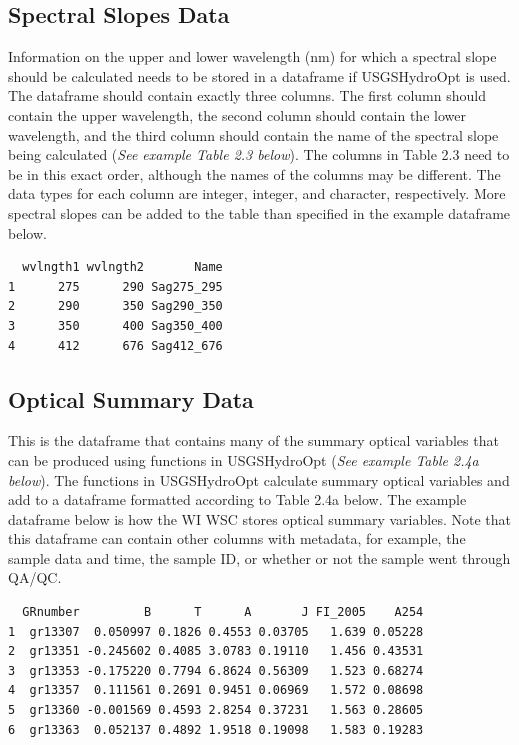 \documentclass[a4paper,11pt]{article}\usepackage[]{graphicx}\usepackage[]{color}
\makeatletter
\newenvironment{kframe}{%
 \def\at@end@of@kframe{}%
 \ifinner\ifhmode%
  \def\at@end@of@kframe{\end{minipage}}%
  \begin{minipage}{\columnwidth}%
 \fi\fi%
 \def\FrameCommand##1{\hskip\@totalleftmargin \hskip-\fboxsep
 \colorbox{shadecolor}{##1}\hskip-\fboxsep
     \hskip-\linewidth \hskip-\@totalleftmargin \hskip\columnwidth}%
 \MakeFramed {\advance\hsize-\width
   \@totalleftmargin\z@ \linewidth\hsize
   \@setminipage}}%
 {\par\unskip\endMakeFramed%
 \at@end@of@kframe}
\newenvironment{knitrout}{}{} %
\makeatother
\begin{document}
\subsection{Spectral Slopes Data}
Information on the upper and lower wavelength (nm) for which a spectral slope should be calculated needs to be stored in a dataframe if USGSHydroOpt is used. The dataframe should contain exactly three columns. The first column should contain the upper wavelength, the second column should contain the lower wavelength, and the third column should contain the name of the spectral slope being calculated (\emph{See example Table 2.3 below}). The columns in Table 2.3 need to be in this exact order, although the names of the columns may be different. The data types for each column are integer, integer, and character, respectively. More spectral slopes can be added to the table than specified in the example dataframe below.

\begin{knitrout}
\color{fgcolor}\begin{kframe}
\begin{verbatim}
  wvlngth1 wvlngth2       Name
1      275      290 Sag275_295
2      290      350 Sag290_350
3      350      400 Sag350_400
4      412      676 Sag412_676
\end{verbatim}
\end{kframe}
\end{knitrout}

\subsection{Optical Summary Data}
This is the dataframe that contains many of the summary optical variables that can be produced using functions in USGSHydroOpt (\emph{See example Table 2.4a below}). The functions in USGSHydroOpt calculate summary optical variables and add to a dataframe formatted according to Table 2.4a below.  The example dataframe below is how the WI WSC stores optical summary variables. Note that this dataframe can contain other columns with metadata, for example, the sample data and time, the sample ID, or whether or not the sample went through QA/QC.

\begin{knitrout}
\color{fgcolor}\begin{kframe}
\begin{verbatim}
  GRnumber         B      T      A       J FI_2005    A254
1  gr13307  0.050997 0.1826 0.4553 0.03705   1.639 0.05228
2  gr13351 -0.245602 0.4085 3.0783 0.19110   1.456 0.43531
3  gr13353 -0.175220 0.7794 6.8624 0.56309   1.523 0.68274
4  gr13357  0.111561 0.2691 0.9451 0.06969   1.572 0.08698
5  gr13360 -0.001569 0.4593 2.8254 0.37231   1.563 0.28605
6  gr13363  0.052137 0.4892 1.9518 0.19098   1.583 0.19283
\end{verbatim}
\end{kframe}
\end{knitrout}
\end{document}
